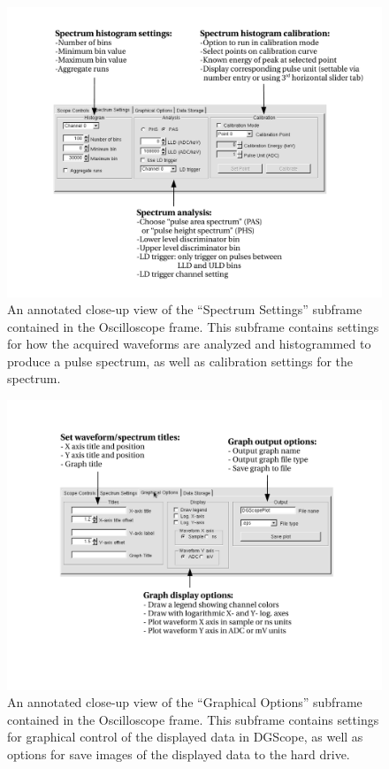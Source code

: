 \begin{figure}
  \centering
  \includegraphics[width=6in]{images/OscilloscopeSpectrum}
    \caption{An annotated close-up view of the ``Spectrum Settings''
    subframe contained in the Oscilloscope frame. This subframe contains
    settings for how the acquired waveforms are analyzed and
    histogrammed to produce a pulse spectrum, as well as calibration
    settings for the spectrum.}
  \label{fig:spectrumsubframe}
\end{figure}


\begin{figure}
  \centering
  \includegraphics[width=6in]{images/OscilloscopeGraphical}
  \caption{An annotated close-up view of the ``Graphical Options''
    subframe contained in the Oscilloscope frame. This subframe contains
    settings for graphical control of the displayed data in DGScope,
    as well as options for save images of the displayed data to the
    hard drive.}
  \label{fig:graphicalsubframe}
\end{figure}

